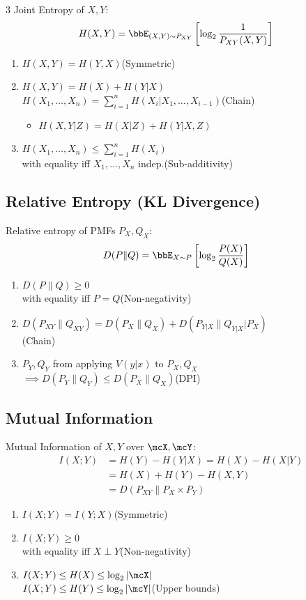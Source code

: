 \documentclass[12pt, a4paper]{article}
\begin{document}
\begin{multicols*}{3}
Joint Entropy of $X,Y$:
\begin{align*}
  H(X,Y) &= \E_{(X,Y)\sim P_{XY}}\left[\log_2 \frac{1}{P_{XY}(X,Y)}\right]
\end{align*}
\begin{enumerate}
  \item $H(X,Y) = H(Y,X)$\hfill(Symmetric)
  \item $H(X,Y) = H(X) + H(Y|X)$\\
    $H(X_1,\dots,X_n) = \sum^n_{i=1}H(X_i | X_1,\dots,X_{i-1})$\hfill(Chain)
    \begin{itemize}[leftmargin=*]\vspace{3pt}
      \item $H(X,Y|Z) = H(X|Z) + H(Y|X,Z)$
    \end{itemize}
  \item $H(X_1,\dots,X_n)\le \sum_{i=1}^n H(X_i)$\\ with equality iff $X_1,\dots,X_n$ indep.\hfill(Sub-additivity)
\end{enumerate}

\colbreak
\subsection{Relative Entropy (KL Divergence)}
Relative entropy of PMFs $P_X,Q_X$:
\begin{align*}
  D(P\|Q) &= \E_{X\sim P}\left[\log_2 \frac{P(X)}{Q(X)}\right]
\end{align*}
\begin{enumerate}[\roman*.]
  \item $D(P\|Q)\ge 0$\\ 
    with equality iff $P=Q$\hfill(Non-negativity)
  \item $D(P_{XY}\|Q_{XY})=D(P_X\|Q_X)+D(P_{Y|X}\|Q_{Y|X}|P_X)$\\\hfill(Chain)
  \item $P_Y,Q_Y$ from applying $V(y|x)$ to $P_X,Q_X$\\$\implies D(P_Y\|Q_Y)\le D(P_X\|Q_X)$\hfill(DPI)
\end{enumerate}

\subsection{Mutual Information}
Mutual Information of $X,Y$ over $\mcX,\mcY$:
\begin{align*}
  I(X;Y) &= H(Y) - H(Y|X) = H(X) - H(X|Y)\\
         &= H(X) + H(Y) - H(X,Y)\\
         &= D(P_{XY}\|P_X \times P_Y)
\end{align*}
\begin{enumerate}[\roman*.]
  \item $I(X;Y) = I(Y;X)$\hfill(Symmetric)
  \item $I(X;Y)\ge 0$\\with equality iff $X\perp Y$\hfill(Non-negativity)
  \item $I(X;Y)\le H(X)\le \log_2|\mcX|$\\
        $I(X;Y)\le H(Y)\le \log_2|\mcY|$\hfill(Upper bounds)
\end{enumerate}


\end{multicols*}
\end{document}

